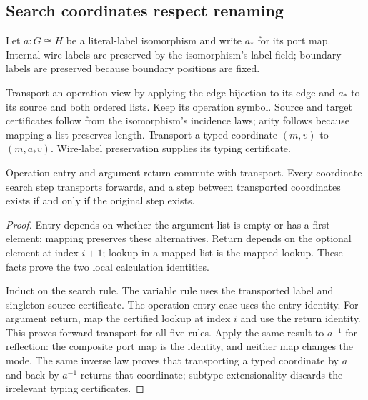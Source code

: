 \subsection{Search coordinates respect renaming}
\label{sec:search-renaming}
Let $a:G\cong H$ be a literal-label isomorphism and write $a_*$ for its port
map. Internal wire labels are preserved by the isomorphism's label field;
boundary labels are preserved because boundary positions are fixed.

\begin{definition}
Transport an operation view by applying the edge bijection to its edge and
$a_*$ to its source and both ordered lists. Keep its operation symbol.
Source and target certificates follow from the isomorphism's incidence laws;
arity follows because mapping a list preserves length. Transport a typed
coordinate $(m,v)$ to $(m,a_*v)$. Wire-label preservation supplies its typing
certificate.
\end{definition}

\begin{lemma}
Operation entry and argument return commute with transport. Every coordinate
search step transports forwards, and a step between transported coordinates
exists if and only if the original step exists.
\end{lemma}
\begin{proof}
Entry depends on whether the argument list is empty or has a first element;
mapping preserves these alternatives. Return depends on the optional element
at index $i+1$; lookup in a mapped list is the mapped lookup. These facts prove
the two local calculation identities.

Induct on the search rule. The variable rule uses the transported label and
singleton source certificate. The operation-entry case uses the entry identity.
For argument return, map the certified lookup at index $i$ and use the return
identity. This proves forward transport for all five rules. Apply the same
result to $a^{-1}$ for reflection: the composite port map is the identity,
and neither map changes the mode. The same inverse law proves that transporting
a typed coordinate by $a$ and back by $a^{-1}$ returns that coordinate; subtype
extensionality discards the irrelevant typing certificates.
\end{proof}

